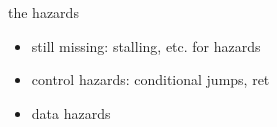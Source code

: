 \begin{frame}{the hazards}
    \begin{itemize}
    \item still missing: stalling, etc. for hazards
        \vspace{.5cm}
    \item control hazards: conditional jumps, ret
    \item data hazards
    \end{itemize}
\end{frame}
